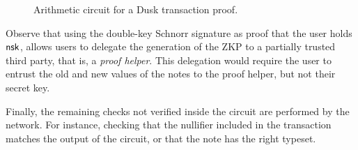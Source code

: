 \begin{figure}[h]
	\centering
	\setlength{\fboxsep}{5pt}%
	\setlength{\fboxrule}{0.3pt}%
	\caption{Arithmetic circuit for a Dusk transaction proof.}
	\label{fig:circuit}
\end{figure}

Observe that using the double-key Schnorr signature as proof that the user holds $\mathsf{nsk}$, allows users to delegate the generation of the ZKP to a partially trusted third party, that is, a \textit{proof helper}. This delegation would require the user to entrust the old and new values of the notes to the proof helper, but not their secret key. 

Finally, the remaining checks not verified inside the circuit are performed by the network. For instance, checking that the nullifier included in the transaction matches the output of the circuit, or that the note has the right typeset.





